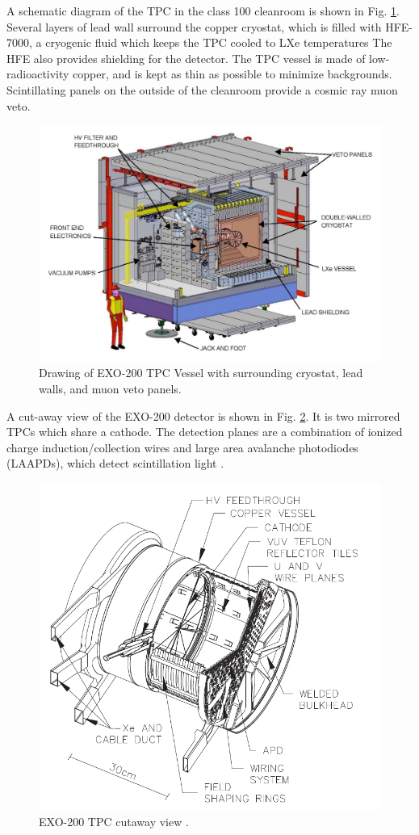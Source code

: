 A schematic diagram of the TPC in the class 100 cleanroom is shown in Fig. \ref{fig:cleanroom}.  Several layers of lead wall surround the copper cryostat, which is filled with HFE-7000, a cryogenic fluid which keeps the TPC cooled to LXe temperatures  The HFE also provides shielding for the detector.  The TPC vessel is made of low-radioactivity copper, and is kept as thin as possible to minimize backgrounds.  Scintillating panels on the outside of the cleanroom provide a cosmic ray muon veto.

\begin{figure} %
	\centering
	\includegraphics[width=.9\textwidth]{figures/cleanroom.png}
	\caption{Drawing of EXO-200 TPC Vessel with surrounding cryostat, lead walls, and muon veto panels.}
\label{fig:cleanroom}
\end{figure}

A cut-away view of the EXO-200 detector is shown in Fig. \ref{fig:tpc}.  It is two mirrored TPCs which share a cathode.  The detection planes are a combination of ionized charge induction/collection wires and large area avalanche photodiodes (LAAPDs), which detect scintillation light \cite{APDs}.

\begin{figure} %
	\centering
	\includegraphics[width=.9\textwidth]{figures/TPC.png}
	\caption{EXO-200 TPC cutaway view \cite{EXO200TwoNuLong}.}
\label{fig:tpc}
\end{figure}


